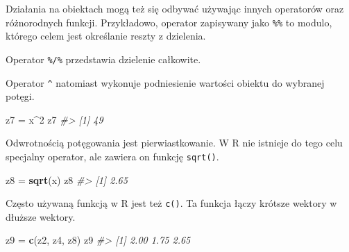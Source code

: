 \documentclass[paper=6in:9in,pagesize=pdftex,headinclude=on,footinclude=on,10pt]{scrbook}
\newenvironment{Shaded}{\begin{snugshade}}{\end{snugshade}}
\newcommand{\CommentTok}[1]{\textcolor[rgb]{0.56,0.35,0.01}{\textit{#1}}}
\newcommand{\DecValTok}[1]{\textcolor[rgb]{0.00,0.00,0.81}{#1}}
\newcommand{\KeywordTok}[1]{\textcolor[rgb]{0.13,0.29,0.53}{\textbf{#1}}}
\newcommand{\NormalTok}[1]{#1}
\newcommand{\OperatorTok}[1]{\textcolor[rgb]{0.81,0.36,0.00}{\textbf{#1}}}
\newcommand{\StringTok}[1]{\textcolor[rgb]{0.31,0.60,0.02}{#1}}
\begin{document}
Działania na obiektach mogą też się odbywać używając innych operatorów oraz różnorodnych funkcji.
Przykładowo, operator zapisywany jako \texttt{\%\%} to modulo, którego celem jest określanie reszty z dzielenia.

\begin{Shaded}
\end{Shaded}

Operator \texttt{\%/\%} przedstawia dzielenie całkowite.

\begin{Shaded}
\end{Shaded}

Operator \texttt{\^{}} natomiast wykonuje podniesienie wartości obiektu do wybranej potęgi.

\begin{Shaded}
\begin{Highlighting}[]
\NormalTok{z7 =}\StringTok{ }\NormalTok{x}\OperatorTok{^}\DecValTok{2}
\NormalTok{z7}
\CommentTok{#> [1] 49}
\end{Highlighting}
\end{Shaded}

Odwrotnością potęgowania jest pierwiastkowanie.
W R nie istnieje do tego celu specjalny operator, ale zawiera on funkcję \texttt{sqrt()}.

\begin{Shaded}
\begin{Highlighting}[]
\NormalTok{z8 =}\StringTok{ }\KeywordTok{sqrt}\NormalTok{(x)}
\NormalTok{z8}
\CommentTok{#> [1] 2.65}
\end{Highlighting}
\end{Shaded}

Często używaną funkcją w R jest też \texttt{c()}.
Ta funkcja łączy krótsze wektory w dłuższe wektory.

\begin{Shaded}
\begin{Highlighting}[]
\NormalTok{z9 =}\StringTok{ }\KeywordTok{c}\NormalTok{(z2, z4, z8)}
\NormalTok{z9}
\CommentTok{#> [1] 2.00 1.75 2.65}
\end{Highlighting}
\end{Shaded}
\end{document}
